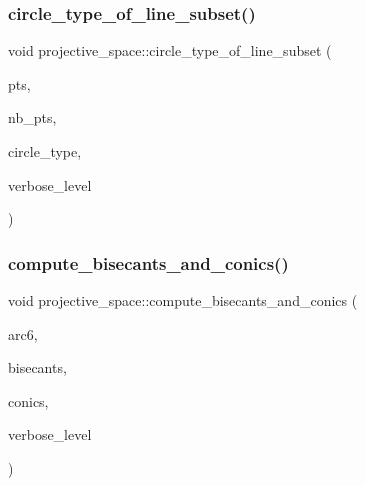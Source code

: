 \subsubsection{\texorpdfstring{circle\+\_\+type\+\_\+of\+\_\+line\+\_\+subset()}{circle\_type\_of\_line\_subset()}}
{\footnotesize\ttfamily void projective\+\_\+space\+::circle\+\_\+type\+\_\+of\+\_\+line\+\_\+subset (\begin{DoxyParamCaption}\item[{\mbox{\hyperlink{galois_8h_a09fddde158a3a20bd2dcadb609de11dc}{I\+NT}} $\ast$}]{pts,  }\item[{\mbox{\hyperlink{galois_8h_a09fddde158a3a20bd2dcadb609de11dc}{I\+NT}}}]{nb\+\_\+pts,  }\item[{\mbox{\hyperlink{galois_8h_a09fddde158a3a20bd2dcadb609de11dc}{I\+NT}} $\ast$}]{circle\+\_\+type,  }\item[{\mbox{\hyperlink{galois_8h_a09fddde158a3a20bd2dcadb609de11dc}{I\+NT}}}]{verbose\+\_\+level }\end{DoxyParamCaption})}

\mbox{\label{classprojective__space_ac91b6a0aba755991c572d8d00b4b8560}} 
\subsubsection{\texorpdfstring{compute\+\_\+bisecants\+\_\+and\+\_\+conics()}{compute\_bisecants\_and\_conics()}}
{\footnotesize\ttfamily void projective\+\_\+space\+::compute\+\_\+bisecants\+\_\+and\+\_\+conics (\begin{DoxyParamCaption}\item[{\mbox{\hyperlink{galois_8h_a09fddde158a3a20bd2dcadb609de11dc}{I\+NT}} $\ast$}]{arc6,  }\item[{\mbox{\hyperlink{galois_8h_a09fddde158a3a20bd2dcadb609de11dc}{I\+NT}} $\ast$\&}]{bisecants,  }\item[{\mbox{\hyperlink{galois_8h_a09fddde158a3a20bd2dcadb609de11dc}{I\+NT}} $\ast$\&}]{conics,  }\item[{\mbox{\hyperlink{galois_8h_a09fddde158a3a20bd2dcadb609de11dc}{I\+NT}}}]{verbose\+\_\+level }\end{DoxyParamCaption})}


